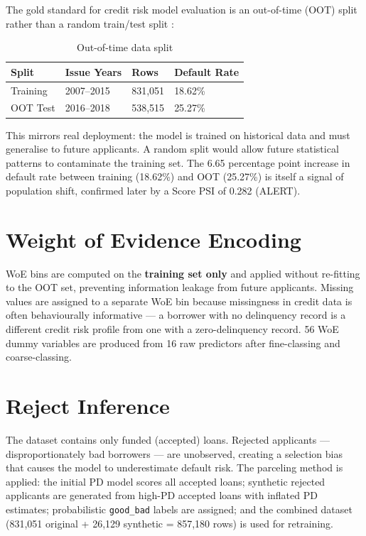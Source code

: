 \documentclass[12pt,a4paper]{report}
\begin{document}
The gold standard for credit risk model evaluation is an out-of-time (OOT) split rather than a random train/test split \cite{siddiqi2006, thomas2002}:

\begin{table}[H]
\centering
\caption{Out-of-time data split}
\label{tab:split}
\begin{tabular}{llll}
\toprule
\textbf{Split} & \textbf{Issue Years} & \textbf{Rows} & \textbf{Default Rate} \\
\midrule
Training & 2007--2015 & 831,051  & 18.62\% \\
OOT Test & 2016--2018 & 538,515  & 25.27\% \\
\bottomrule
\end{tabular}
\end{table}

This mirrors real deployment: the model is trained on historical data and must generalise to future applicants. A random split would allow future statistical patterns to contaminate the training set. The 6.65 percentage point increase in default rate between training (18.62\%) and OOT (25.27\%) is itself a signal of population shift, confirmed later by a Score PSI of 0.282 (ALERT).

\section{Weight of Evidence Encoding}

WoE bins are computed on the \textbf{training set only} and applied without re-fitting to the OOT set, preventing information leakage from future applicants. Missing values are assigned to a separate WoE bin because missingness in credit data is often behaviourally informative \cite{lund2021} --- a borrower with no delinquency record is a different credit risk profile from one with a zero-delinquency record. 56 WoE dummy variables are produced from 16 raw predictors after fine-classing and coarse-classing.

\section{Reject Inference}

The dataset contains only funded (accepted) loans. Rejected applicants --- disproportionately bad borrowers --- are unobserved, creating a selection bias that causes the model to underestimate default risk. The parceling method \cite{siddiqi2006} is applied: the initial PD model scores all accepted loans; synthetic rejected applicants are generated from high-PD accepted loans with inflated PD estimates; probabilistic \texttt{good\_bad} labels are assigned; and the combined dataset (831,051 original + 26,129 synthetic = 857,180 rows) is used for retraining.
\end{document}
